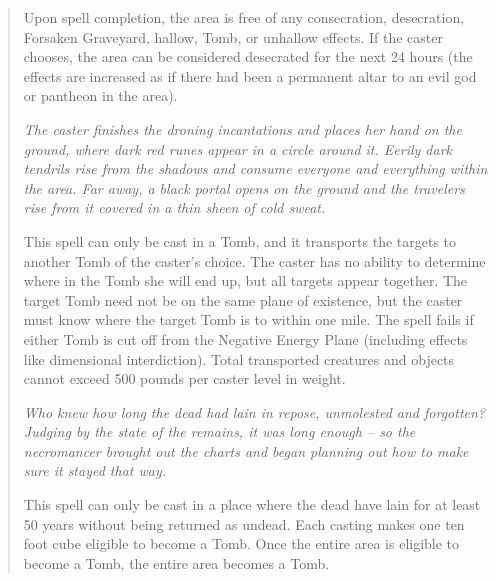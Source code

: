 \begin{quote}
Upon spell completion, the area is free of any consecration, desecration, Forsaken Graveyard, hallow, Tomb, or unhallow effects. If the caster chooses, the area can be considered desecrated for the next 24 hours (the effects are increased as if there had been a permanent altar to an evil god or pantheon in the area).


\begin{small}
\end{small}
\emph{The caster finishes the droning incantations and places her hand on the ground, where dark red runes appear in a circle around it. Eerily dark tendrils rise from the shadows and consume everyone and everything within the area. Far away, a black portal opens on the ground and the travelers rise from it covered in a thin sheen of cold sweat.}

This spell can only be cast in a Tomb, and it transports the targets to another Tomb of the caster's choice. The caster has no ability to determine where in the Tomb she will end up, but all targets appear together. The target Tomb need not be on the same plane of existence, but the caster must know where the target Tomb is to within one mile. The spell fails if either Tomb is cut off from the Negative Energy Plane (including effects like dimensional interdiction). Total transported creatures and objects cannot exceed 500 pounds per caster level in weight.\\

\begin{small}
\end{small}
\emph{Who knew how long the dead had lain in repose, unmolested and forgotten? Judging by the state of the remains, it was long enough -- so the necromancer brought out the charts and began planning out how to make sure it stayed that way.}

This spell can only be cast in a place where the dead have lain for at least 50 years without being returned as undead. Each casting makes one ten foot cube eligible to become a Tomb. Once the entire area is eligible to become a Tomb, the entire area becomes a Tomb.

\end{quote}


